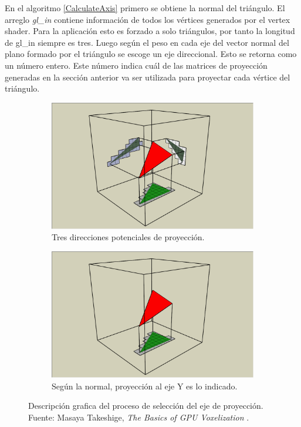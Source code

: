 En el algoritmo \ref{CalculateAxis} primero se obtiene la normal del triángulo. El arreglo \emph{gl\_in} contiene información de todos los vértices generados por el vertex shader. Para la aplicación esto es forzado a solo triángulos, por tanto la longitud de gl\_in siempre es tres. Luego según el peso en cada eje del vector normal del plano formado por el triángulo se escoge un eje direccional. Esto se retorna como un número entero. Este número indica cuál de las matrices de proyección generadas en la sección anterior va ser utilizada para proyectar cada vértice del triángulo.

\begin{figure}[H]
	\centering
	\begin{subfigure}[t]{.49\linewidth}
		\centering
		\captionsetup{justification=centering}
		\includegraphics[width=\linewidth]{media/Voxelization_blog_fig_5.png}
		\caption*{Tres direcciones potenciales de proyección.}
	\end{subfigure}%
	\hspace{0.01\textwidth}
	\begin{subfigure}[t]{.49\linewidth}
		\centering
		\captionsetup{justification=centering}
		\includegraphics[width=\linewidth]{media/Voxelization_blog_fig_6.png}
		\caption*{Según la normal, proyección al eje Y es lo indicado.}
	\end{subfigure}%
	\caption{Descripción grafica del proceso de selección del eje de proyección. Fuente: Masaya Takeshige, \emph{The Basics of GPU Voxelization} \cite{gpuvoxelization}.}
	\label{fig:axis_selection}
\end{figure}


